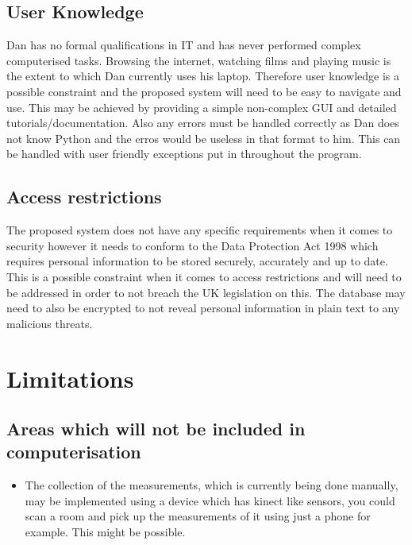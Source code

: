 \subsection{User Knowledge}

\begin{flushleft}
	Dan has no formal qualifications in IT and has never performed complex computerised tasks. Browsing the internet, watching films and playing music is the extent to which Dan currently uses his laptop. Therefore user knowledge is a possible constraint and the proposed system will need to be easy to navigate and use. This may be achieved by providing a simple non-complex GUI and detailed tutorials/documentation. Also any errors must be handled correctly as Dan does not know Python and the erros would be useless in that format to him. This can be handled with user friendly exceptions put in throughout the program.

\end{flushleft}

\subsection{Access restrictions}

\begin{flushleft}
	The proposed system does not have any specific requirements when it comes to security however it needs to conform to the Data Protection Act 1998 which requires personal information to be stored securely, accurately and up to date. This is a possible constraint when it comes to access restrictions and will need to be addressed in order to not breach the UK legislation on this. The database may need to also be encrypted to not reveal personal information in plain text to any malicious threats.
\end{flushleft}

\section{Limitations}

\subsection{Areas which will not be included in computerisation}

	\begin{itemize}
			\item The collection of the measurements, which is currently being done manually, may be implemented using a device which has kinect like sensors, you could scan a room and pick up the measurements of it using just a phone for example. This might be possible.

	\end{itemize}

